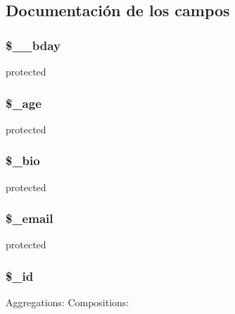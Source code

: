 \subsection{Documentación de los campos}
\hypertarget{class_u_s_e_r_a45989f84816f9c5b99cc3b18dc23ba48}{
\subsubsection[{\$\-\_\-\-\_\-bday}]{\setlength{\rightskip}{0pt plus 5cm}\$\-\_\-\-\_\-bday\hspace{0.3cm}{\ttfamily [protected]}}}\label{class_u_s_e_r_a45989f84816f9c5b99cc3b18dc23ba48}
protected \hypertarget{class_u_s_e_r_a9c749fcfc61978947fbbffcb09e713c6}{
\subsubsection[{\$\-\_\-age}]{\setlength{\rightskip}{0pt plus 5cm}\$\-\_\-age\hspace{0.3cm}{\ttfamily [protected]}}}\label{class_u_s_e_r_a9c749fcfc61978947fbbffcb09e713c6}
protected \hypertarget{class_u_s_e_r_a4df3a432bdd1a0da13ee36bae6db0147}{
\subsubsection[{\$\-\_\-bio}]{\setlength{\rightskip}{0pt plus 5cm}\$\-\_\-bio\hspace{0.3cm}{\ttfamily [protected]}}}\label{class_u_s_e_r_a4df3a432bdd1a0da13ee36bae6db0147}
protected \hypertarget{class_u_s_e_r_a945b9b37db6c8c42e784df999c9ae416}{
\subsubsection[{\$\-\_\-email}]{\setlength{\rightskip}{0pt plus 5cm}\$\-\_\-email\hspace{0.3cm}{\ttfamily [protected]}}}\label{class_u_s_e_r_a945b9b37db6c8c42e784df999c9ae416}
protected \hypertarget{class_u_s_e_r_a64da16c4a1c7b2dc6784f6ef26341ed7}{
\subsubsection[{\$\-\_\-id}]{\setlength{\rightskip}{0pt plus 5cm}\$\-\_\-id\hspace{0.3cm}{\ttfamily [protected]}}}\label{class_u_s_e_r_a64da16c4a1c7b2dc6784f6ef26341ed7}
Aggregations\-: Compositions\-:

